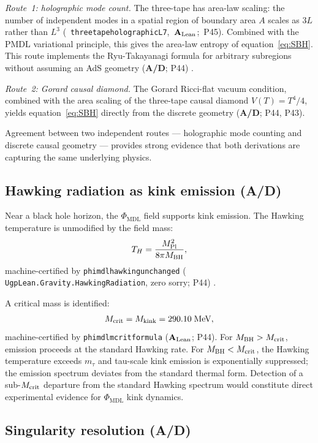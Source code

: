 \documentclass[11pt,openany]{book}
\theoremstyle{remark}
\newcommand{\PHIMDL}{\Phi_{\mathrm{MDL}}}
\newcommand{\lean}[1]{%
  \penalty-100
  \begingroup\def\_{\textunderscore\allowbreak}\texttt{#1}\endgroup}
\newcommand{\mtau}{m_\tau}
\newcommand{\MPl}{M_{\rm Pl}}
\newcommand{\CMCA}{\text{CMCA}}
\newcommand{\CatAL}{\ensuremath{\textbf{A}_{\rm Lean}}}
\newcommand{\CatAD}{\textbf{A/D}}
\begin{document}
\textit{Route~1: holographic mode count.}
The three-tape \CMCA{} has area-law scaling: the number of independent modes in a
spatial region of boundary area $A$ scales as $3L$ rather than $L^3$
\mbox{(\lean{three\_tape\_holographic\_L7}, \CatAL; P45)}.
Combined with the PMDL variational principle, this gives the area-law entropy of
equation~\eqref{eq:SBH}.
This route implements the Ryu-Takayanagi formula for arbitrary subregions without
assuming an AdS geometry (\CatAD; P44) \cite{SpivackQGR}.

\textit{Route~2: Gorard causal diamond.}
The Gorard Ricci-flat vacuum condition, combined with the area scaling of the
three-tape causal diamond $V(T) = T^4/4$, yields equation~\eqref{eq:SBH} directly
from the discrete geometry (\CatAD; P44, P43).

Agreement between two independent routes --- holographic mode counting and discrete
causal geometry --- provides strong evidence that both derivations are capturing the
same underlying physics.

\subsection*{Hawking radiation as kink emission (\CatAD)}

Near a black hole horizon, the $\PHIMDL$ field supports kink emission.
The Hawking temperature is unmodified by the field mass:
\begin{equation}
  T_H = \frac{\MPl^2}{8\pi M_{\rm BH}},
  \label{eq:TH}
\end{equation}
machine-certified by \lean{phimdl\_hawking\_unchanged}
(\lean{UgpLean.Gravity.HawkingRadiation}, zero sorry; P44) \cite{SpivackQGR}.

A critical mass is identified:
\begin{equation}
  M_{\rm crit} = M_{\rm kink} = 290.10\;\text{MeV},
  \label{eq:Mcrit}
\end{equation}
machine-certified by \lean{phimdl\_m\_crit\_formula} (\CatAL; P44).
For $M_{\rm BH} > M_{\rm crit}$, emission proceeds at the standard Hawking rate.
For $M_{\rm BH} < M_{\rm crit}$, the Hawking temperature exceeds $\mtau$ and
tau-scale kink emission is exponentially suppressed; the emission spectrum deviates
from the standard thermal form.
Detection of a sub-$M_{\rm crit}$ departure from the standard Hawking spectrum
would constitute direct experimental evidence for $\PHIMDL$ kink dynamics.

\subsection*{Singularity resolution (\CatAD)}
\end{document}
